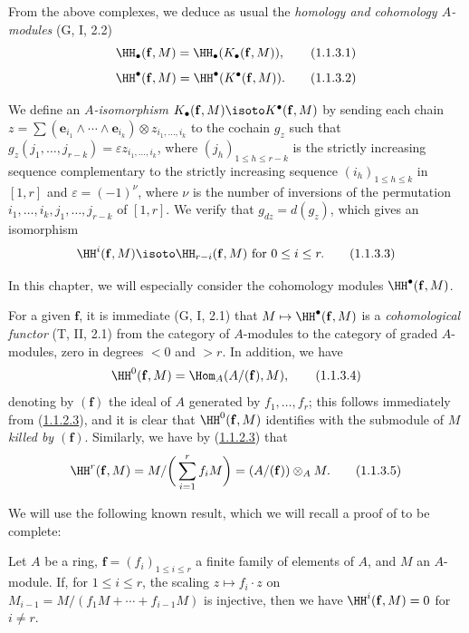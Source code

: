 \begin{env}[1.1.3]
\label{III.1.1.3}
From the above complexes, we deduce as usual the \emph{homology and cohomology $A$-modules} (G, I, 2.2)
\[
  \HH_\bullet(\mathbf{f},M)=\HH_\bullet(K_\bullet(\mathbf{f},M)),
  \tag{1.1.3.1}
\]
\[
  \HH^\bullet(\mathbf{f},M)=\HH^\bullet(K^\bullet(\mathbf{f},M)).
  \tag{1.1.3.2}
\]

We define an \emph{$A$-isomorphism $K_\bullet(\mathbf{f},M)\isoto K^\bullet(\mathbf{f},M)$} by sending each chain $z=\sum(\mathbf{e}_{i_1}\wedge\cdots\wedge\mathbf{e}_{i_k})\otimes z_{i_1,\dots,i_k}$ to the cochain $g_z$ such that $g_z(j_1,\dots,j_{r-k})=\varepsilon z_{i_1,\dots,i_k}$, where $(j_h)_{1\leq h\leq r-k}$ is the strictly increasing sequence complementary to the strictly increasing sequence $(i_h)_{1\leq h\leq k}$ in $[1,r]$ and $\varepsilon=(-1)^\nu$, where $\nu$ is the number of inversions of the permutation $i_1,\dots,i_k,j_1,\dots,j_{r-k}$ of $[1,r]$.
We verify that $g_{dz}=d(g_z)$, which gives an isomorphism
\[
  \HH^i(\mathbf{f},M)\isoto\HH_{r-i}(\mathbf{f},M)\text{ for }0\leq i\leq r.
  \tag{1.1.3.3}\label{III.1.1.3.3}
\]

In this chapter, we will especially consider the cohomology modules $\HH^\bullet(\mathbf{f},M)$.

For a given $\mathbf{f}$, it is immediate (G, I, 2.1) that $M\mapsto\HH^\bullet(\mathbf{f},M)$ is a \emph{cohomological functor} (T, II, 2.1) from the category of $A$-modules to the category of graded $A$-modules, zero in degrees $<0$ and $>r$.
In addition, we have
\[
  \HH^0(\mathbf{f},M)=\Hom_A(A/(\mathbf{f}),M),
  \tag{1.1.3.4}
\]
denoting by $(\mathbf{f})$ the ideal of $A$ generated by $f_1,\dots,f_r$; this follows immediately from (\hyperref[III.1.1.2.3]{1.1.2.3}), and it is clear that $\HH^0(\mathbf{f},M)$ identifies with the submodule of $M$ \emph{killed by $(\mathbf{f})$}.
Similarly, we have by (\hyperref[III.1.1.2.3]{1.1.2.3}) that
\[
  \HH^r(\mathbf{f},M)=M/\bigg(\sum_{i=1}^r f_i M\bigg)=(A/(\mathbf{f}))\otimes_A M.
  \tag{1.1.3.5}\label{III.1.1.3.5}
\]

We will use the following known result, which we will recall a proof of to be complete:
\end{env}

\begin{proposition}[1.1.4]
\label{III.1.1.4}
Let $A$ be a ring, $\mathbf{f}=(f_i)_{1\leq i\leq r}$ a finite family of elements of $A$, and $M$ an $A$-module.
If, for $1\leq i\leq r$, the scaling $z\mapsto f_i\cdot z$ on $M_{i-1}=M/(f_1 M+\cdots+f_{i-1}M)$ is injective, then we have $\HH^i(\mathbf{f},M)=0$ for $i\neq r$.
\end{proposition}

